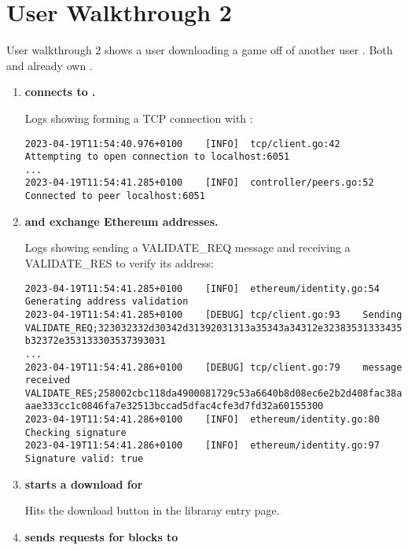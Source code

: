 
\section*{User Walkthrough 2}

User walkthrough 2 shows a user  downloading a game  off of another user . Both  and  already own .

\begin{enumerate}[itemsep=2.5pt]
  \item \textbf{ connects to .}
  
  Logs showing  forming a TCP connection with : 
\begin{lstlisting}[breaklines=true, postbreak=\mbox{\textcolor{red}{$\hookrightarrow$}\space}]
2023-04-19T11:54:40.976+0100	[INFO]	tcp/client.go:42	Attempting to open connection to localhost:6051
...
2023-04-19T11:54:41.285+0100	[INFO]	controller/peers.go:52	Connected to peer localhost:6051
\end{lstlisting}

  \item \textbf{ and  exchange Ethereum addresses.}
  
  Logs showing  sending  a VALIDATE\_REQ message and receiving a VALIDATE\_RES to verify its address: 
\begin{lstlisting}[breaklines=true, postbreak=\mbox{\textcolor{red}{$\hookrightarrow$}\space}]
2023-04-19T11:54:41.285+0100	[INFO]	ethereum/identity.go:54	Generating address validation
2023-04-19T11:54:41.285+0100	[DEBUG]	tcp/client.go:93	Sending VALIDATE_REQ;323032332d30342d31392031313a35343a34312e32383531333435202b3031303020425354206d3d2 b32372e353133303537393031
...
2023-04-19T11:54:41.286+0100	[DEBUG]	tcp/client.go:79	message received VALIDATE_RES;258002cbc118da4900081729c53a6640b8d08ec6e2b2d408fac38a7e7f44cfa705c4ac3231bcc aae333cc1c0846fa7e32513bccad5dfac4cfe3d7fd32a60155300
2023-04-19T11:54:41.286+0100	[INFO]	ethereum/identity.go:80	Checking signature
2023-04-19T11:54:41.286+0100	[INFO]	ethereum/identity.go:97	Signature valid: true
\end{lstlisting}

  \item \textbf{ starts a download for }
  
   Hits the download button in the libraray entry page.

  \item \textbf{ sends requests for blocks to }
  

\end{enumerate}
